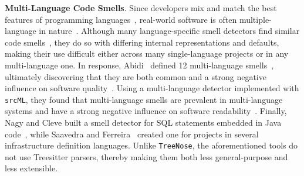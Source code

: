 
{\bf Multi-Language Code Smells}.
%
Since developers mix and match the best features of programming
languages~\cite{7476675}, real-world software is often multiple-language in
nature~\cite{723183}.
%
Although many language-specific smell detectors find similar code
smells~\cite{CheckStyle,DesigniteJava,Jscent,PMD,Pysmell}, they do so with
differing internal representations and defaults, making their use difficult
either across many single-language projects or in any multi-language one.
%
In response, Abidi~\etal{} defined 12 multi-language
smells~\cite{MultiLanguageCodeSmells}, ultimately discovering that they are
both common and a strong negative influence on software quality~\cite{Abidi2}.
%
Using a multi-language detector implemented with \texttt{srcML}, they found
that multi-language smells are prevalent in multi-language systems and have a
strong negative influence on software readability~\cite{Fault-Prone}.
%
Finally, Nagy and Cleve built a smell detector for SQL statements embedded in
Java code~\cite{SQLInJava}, while Saavedra and Ferreira~\cite{Saavedra2023}
created one for projects in several infrastructure definition languages.
%
Unlike \texttt{TreeNose}, the aforementioned tools do not use Treesitter
parsers, thereby making them both less general-purpose and less extensible.
